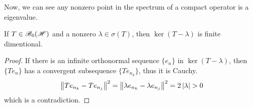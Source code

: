 Now, we can see any nonzero point in the spectrum of a compact operator is a eigenvalue.

\begin{lem}
	If $T \in \mathscr{B}_{0}\mathscr{(H)}$ and a nonzero $\lambda \in \sigma(T)$, then $\ker{(T-\lambda)}$ is finite dimentional.
\end{lem}
\begin{proof}
	If there is an infinite orthonormal sequence $\{e_n\}$ in $\ker{(T-\lambda)}$, then $\{Te_n\}$ has a convergent subsequence $\{Te_{n_k}\}$, thus it is Cauchy.
	\begin{equation*}
		\left\lVert Te_{n_k}-Te_{n_j}\right\lVert^2 = \left\lVert\lambda e_{n_k}-\lambda e_{n_j}\right\lVert^2 = 2 \left\lvert\lambda\right\lvert > 0
	\end{equation*}
	which is a contradiction.
\end{proof}

